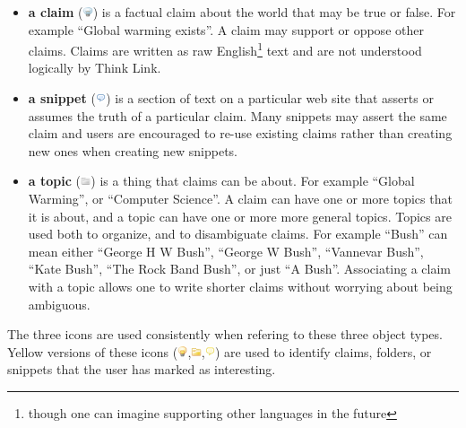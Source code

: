\documentclass{chi2009}
\begin{document}
\begin{itemize}
\item {\bf a claim} (\includegraphics[width=0.3cm]{../images/lightbulb_off.png}) is a factual claim about the world that may be true or false. For example ``Global warming exists''. A claim may support or oppose other claims. Claims are written as raw English\footnote{though one can imagine supporting other languages in the future} text and are not understood logically by Think Link.
\item {\bf a snippet} (\includegraphics[width=0.3cm]{../images/comment.png}) is a section of text on a particular web site that asserts or assumes the truth of a particular claim. Many snippets may assert the same claim and users are encouraged to re-use existing claims rather than creating new ones when creating new snippets.
\item {\bf a topic} (\includegraphics[width=0.3cm]{../images/folder_grey.png}) is a thing that claims can be about. For example ``Global Warming'', or ``Computer Science''. A claim can have one or more topics that it is about, and a topic can have one or more more general topics. Topics are used both to organize, and to disambiguate claims. For example ``Bush'' can mean either ``George H W Bush'', ``George W Bush'', ``Vannevar Bush'', ``Kate Bush'', ``The Rock Band Bush'', or just ``A Bush''. Associating a claim with a topic allows one to write shorter claims without worrying about being ambiguous.
\end{itemize}

The three icons are used consistently when refering to these three object types. 
Yellow versions of these icons (\includegraphics[width=0.3cm]{../images/lightbulb.png},\includegraphics[width=0.3cm]{../images/folder.png},\includegraphics[width=0.3cm]{../images/comment_yellow.png}) are used to identify claims, folders, or snippets that the user has marked as interesting.
\end{document}
